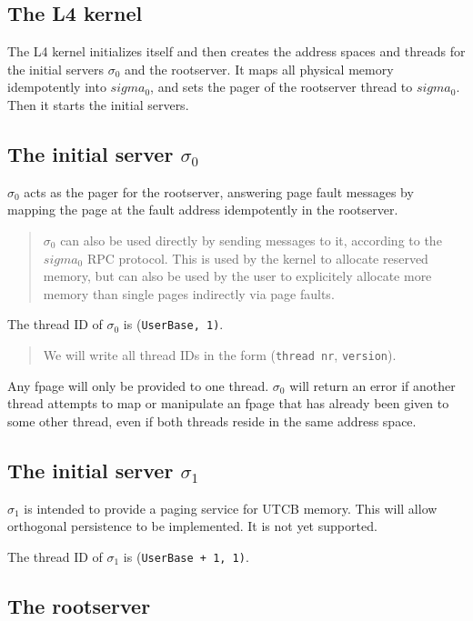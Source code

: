 \documentclass[9pt,a4paper]{extarticle}
\newenvironment{comment}{\footnotesize \begin{quote}}{\end{quote}}
\begin{document}
\subsection{The L4 kernel}

The L4 kernel initializes itself and then creates the address spaces
and threads for the initial servers $\sigma_0$ and the rootserver.  It
maps all physical memory idempotently into $sigma_0$, and sets the
pager of the rootserver thread to $sigma_0$.  Then it starts the
initial servers.


\subsection{The initial server $\sigma_0$}

$\sigma_0$ acts as the pager for the rootserver, answering page fault
messages by mapping the page at the fault address idempotently in the
rootserver.

\begin{comment}
  $\sigma_0$ can also be used directly by sending messages to it,
  according to the $sigma_0$ RPC protocol.  This is used by the kernel
  to allocate reserved memory, but can also be used by the user to
  explicitely allocate more memory than single pages indirectly via
  page faults.
\end{comment}

The thread ID of $\sigma_0$ is (\verb/UserBase, 1)/.

\begin{comment}
  We will write all thread IDs in the form (\verb/thread nr/,
  \verb/version/).
\end{comment}

Any fpage will only be provided to one thread.  $\sigma_0$ will return
an error if another thread attempts to map or manipulate an fpage that
has already been given to some other thread, even if both threads
reside in the same address space.


\subsection{The initial server $\sigma_1$}

$\sigma_1$ is intended to provide a paging service for UTCB memory.
This will allow orthogonal persistence to be implemented.  It is not
yet supported.

The thread ID of $\sigma_1$ is (\verb/UserBase + 1, 1)/.


\subsection{The rootserver}
\label{rootserver}
\end{document}
